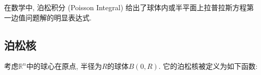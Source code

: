 
\begin{issues}
\issueDraft
\end{issues}

在数学中, 泊松积分 (Poisson Integral) 给出了球体内或半平面上拉普拉斯方程第一边值问题解的明显表达式.

\subsection{泊松核}
考虑$\mathbb{R}^n$中的球心在原点, 半径为$R$的球体$B(0,R)$. 它的泊松核被定义为如下函数:
